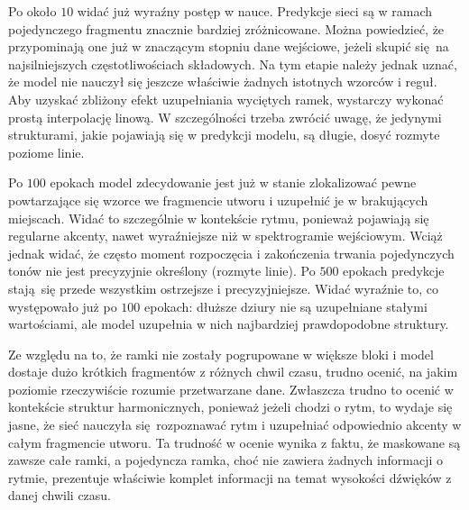 Po około $10$ widać już wyraźny postęp w nauce. Predykcje sieci są w ramach pojedynczego fragmentu znacznie bardziej zróżnicowane. Można powiedzieć, że przypominają one już w znaczącym stopniu dane wejściowe, jeżeli skupić się na najsilniejszych częstotliwościach składowych. Na tym etapie należy jednak uznać, że model nie nauczył się jeszcze właściwie żadnych istotnych wzorców i reguł. Aby uzyskać zbliżony efekt uzupełniania wyciętych ramek, wystarczy wykonać prostą interpolację linową. W szczególności trzeba zwrócić uwagę, że jedynymi strukturami, jakie pojawiają się w predykcji modelu, są długie, dosyć rozmyte poziome linie.

Po $100$ epokach model zdecydowanie jest już w stanie zlokalizować pewne powtarzające się wzorce we fragmencie utworu i uzupełnić je w brakujących miejscach. Widać to szczególnie w kontekście rytmu, ponieważ pojawiają się regularne akcenty, nawet wyraźniejsze niż w spektrogramie wejściowym. Wciąż jednak widać, że często moment rozpoczęcia i zakończenia trwania pojedynczych tonów nie jest precyzyjnie określony (rozmyte linie). Po $500$ epokach predykcje stają się przede wszystkim ostrzejsze i precyzyjniejsze. Widać wyraźnie to, co występowało już po $100$ epokach: dłuższe dziury nie są uzupełniane stałymi wartościami, ale model uzupełnia w nich najbardziej prawdopodobne struktury.

Ze względu na to, że ramki nie zostały pogrupowane w większe bloki i model dostaje dużo krótkich fragmentów z różnych chwil czasu, trudno ocenić, na jakim poziomie rzeczywiście rozumie przetwarzane dane. Zwłaszcza trudno to ocenić w kontekście struktur harmonicznych, ponieważ jeżeli chodzi o rytm, to wydaje się jasne, że sieć nauczyła się rozpoznawać rytm i uzupełniać odpowiednio akcenty w całym fragmencie utworu. Ta trudność w ocenie wynika z faktu, że maskowane są zawsze całe ramki, a pojedyncza ramka, choć nie zawiera żadnych informacji o rytmie, prezentuje właściwie komplet informacji na temat wysokości dźwięków z danej chwili czasu.

